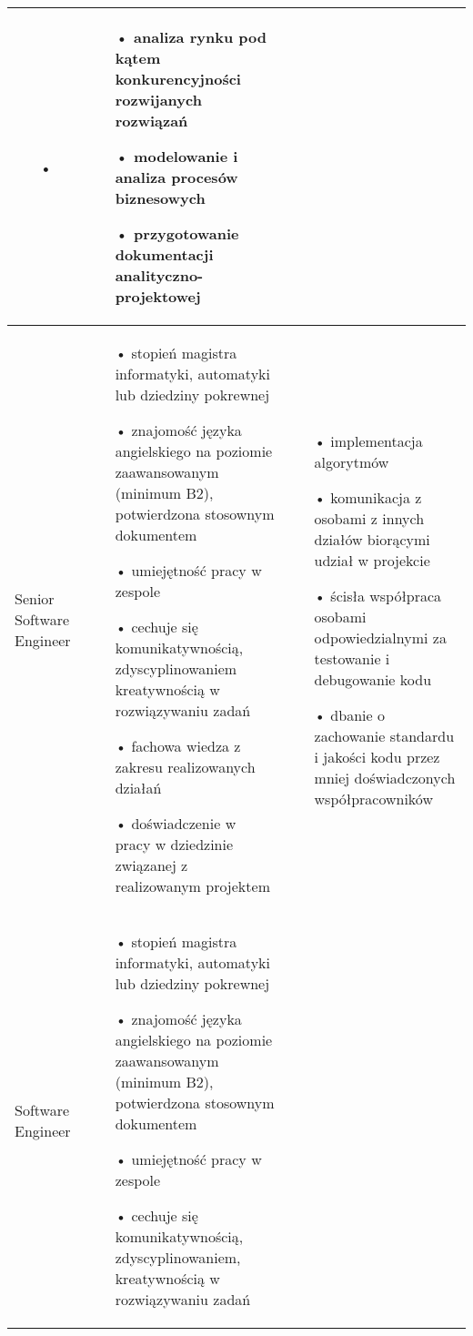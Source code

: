 \begin{center}
\begin{tabular}{ | l | p{5cm} | p{5cm} |}
\begin{itemize}
	\item[•]
	\end{itemize}	    	
     & 
	\begin{itemize}
	\item[•] analiza rynku pod kątem konkurencyjności rozwijanych rozwiązań
	\item[•] modelowanie i analiza procesów biznesowych
	\item[•] przygotowanie dokumentacji analityczno-projektowej
	\end{itemize}	   
	\\ \hline
    Senior Software Engineer & 
	\begin{itemize}
	\item[•] stopień magistra informatyki, automatyki lub dziedziny pokrewnej
	\item[•] znajomość języka angielskiego na poziomie zaawansowanym (minimum B2), potwierdzona stosownym dokumentem
	\item[•] umiejętność pracy w zespole
	\item[•] cechuje się komunikatywnością, zdyscyplinowaniem kreatywnością w rozwiązywaniu zadań 
	\item[•] fachowa wiedza z zakresu realizowanych działań
	\item[•] doświadczenie w pracy w dziedzinie związanej z realizowanym projektem 
	\end{itemize}	    
     & 
	\begin{itemize}
	\item[•] implementacja algorytmów 
	\item[•] komunikacja z osobami z innych działów biorącymi udział w projekcie
	\item[•] ścisła współpraca osobami odpowiedzialnymi za testowanie i debugowanie kodu
	\item[•] dbanie o zachowanie standardu i jakości kodu przez mniej doświadczonych współpracowników
	\end{itemize}	     
    \\ \hline   
    Software Engineer &
    \begin{itemize}
	\item[•] stopień magistra informatyki, automatyki lub dziedziny pokrewnej
	\item[•] znajomość języka angielskiego na poziomie zaawansowanym (minimum B2), potwierdzona stosownym dokumentem
	\item[•] umiejętność pracy w zespole
	\item[•] cechuje się komunikatywnością, zdyscyplinowaniem, kreatywnością w rozwiązywaniu zadań 

\end{itemize}
\end{tabular}
\end{center}
